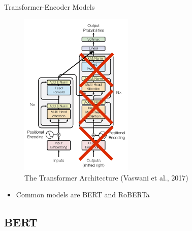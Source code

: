 \documentclass[10pt]{beamer}
\begin{document}

\begin{frame}{Transformer-Encoder Models}

\begin{figure}[h]
\centering
\includegraphics[width=0.48\textwidth]{fig/Vaswani_1_transformer_encoder_model.png}
\caption{The Transformer Architecture (Vaswani et al., 2017)}
\end{figure}
\begin{itemize}
\pause
\item Common models are BERT and RoBERTa
\end{itemize}
\end{frame}

\subsection{BERT}
\end{document}
